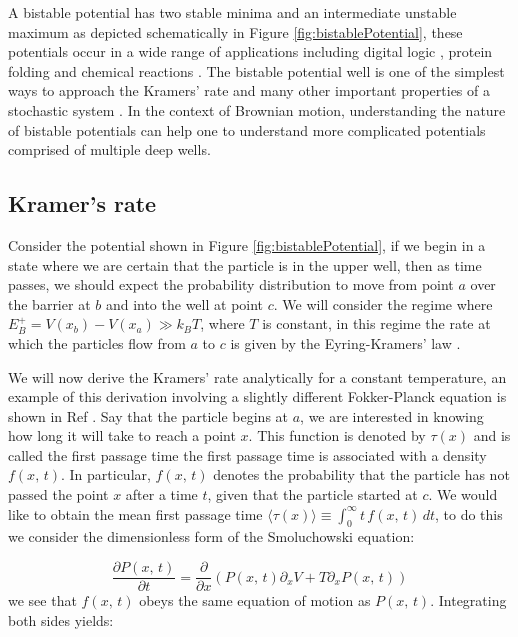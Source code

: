 A bistable potential has two stable minima and an intermediate unstable maximum as depicted schematically in Figure \ref{fig:bistablePotential}, these potentials occur in a wide range of applications including digital logic \cite{MyersCelebranoKrishnan2015,Landauer1961}, protein folding \cite{BryngelsonWolynes1989} and chemical reactions \cite{BernePecora1976}. The bistable potential well is one of the simplest ways to approach the Kramers' rate and many other important properties of a stochastic system \cite{MyersCelebranoKrishnan2015,Barcilon1996,SantamariaHolekGadomskiRubi2011}. In the context of Brownian motion, understanding the nature of bistable potentials can help one to understand more complicated potentials comprised of multiple deep wells.

\subsection{Kramer's rate} \label{kramersRate}
Consider the potential shown in Figure \ref{fig:bistablePotential}, if we begin in a state where we are certain that the particle is in the upper well, then as time passes, we should expect the probability distribution to move from point $a$ over the barrier at $b$ and into the well at point $c$. We will consider the regime where $E^+_B = V(x_b) - V(x_a) \gg k_B T$, where $T$ is constant, in this regime the rate at which the particles flow from $a$ to $c$ is given by the Eyring-Kramers' law \cite{Eyring1935, Kramers1940}.

We will now derive the Kramers' rate analytically for a constant temperature, an example of this derivation involving a slightly different Fokker-Planck equation is shown in Ref \cite{Gardiner2009}. Say that the particle begins at $a$, we are interested in knowing how long it will take to reach a point $x$. This function is denoted by $\tau(x)$ and is called the first passage time \cite{Gardiner2009} the first passage time is associated with a density $f(x, \, t)$. In particular, $f(x, \, t)$ denotes the probability that the particle has not passed the point $x$ after a time $t$, given that the particle started at $c$. We would like to obtain the mean first passage time $\langle \tau(x) \rangle \equiv \int_0^{\infty} t \, f(x, \, t) \, dt$, to do this we consider the dimensionless form of the Smoluchowski equation: 

\begin{equation}
\frac{\partial P(x, \, t)}{\partial t} = \frac{\partial}{\partial x} \left(P(x, \, t) \partial_x V + T \partial_x P(x, \, t) \right)
\end{equation}
we see that $f(x, \, t)$ obeys the same equation of motion as $P(x, \, t)$. Integrating both sides yields:

